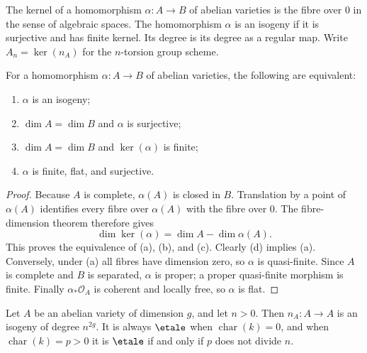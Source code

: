 \begin{definition}[Isogeny]
\label{def:milne-isogeny}

The kernel of a homomorphism $\alpha:A\to B$ of abelian varieties is the fibre
over $0$ in the sense of algebraic spaces.  The homomorphism $\alpha$ is an
isogeny if it is surjective and has finite kernel.  Its degree is its degree as
a regular map.  Write $A_n=\ker(n_A)$ for the $n$-torsion group scheme.
\end{definition}

\begin{proposition}
\label{prop:milne-isogeny-characterization}

For a homomorphism $\alpha:A\to B$ of abelian varieties, the following are
equivalent:
\begin{enumerate}
\item $\alpha$ is an isogeny;
\item $\dim A=\dim B$ and $\alpha$ is surjective;
\item $\dim A=\dim B$ and $\ker(\alpha)$ is finite;
\item $\alpha$ is finite, flat, and surjective.
\end{enumerate}
\end{proposition}

\begin{proof}
Because $A$ is complete, $\alpha(A)$ is closed in $B$.  Translation by a point
of $\alpha(A)$ identifies every fibre over $\alpha(A)$ with the fibre over
$0$.  The fibre-dimension theorem therefore gives
\[
 \dim\ker(\alpha)=\dim A-\dim\alpha(A).
\]
This proves the equivalence of (a), (b), and (c).  Clearly (d) implies (a).
Conversely, under (a) all fibres have dimension zero, so $\alpha$ is
quasi-finite.  Since $A$ is complete and $B$ is separated, $\alpha$ is proper;
a proper quasi-finite morphism is finite.  Finally $\alpha_*\mathcal O_A$ is
coherent and locally free, so $\alpha$ is flat.
\end{proof}

\begin{theorem}
\label{thm:milne-multiplication-degree}

Let $A$ be an abelian variety of dimension $g$, and let $n>0$.  Then
$n_A:A\to A$ is an isogeny of degree $n^{2g}$.  It is always $\etale$ when
$\operatorname{char}(k)=0$, and when $\operatorname{char}(k)=p>0$ it is $\etale$
if and only if $p$ does not divide $n$.
\end{theorem}

